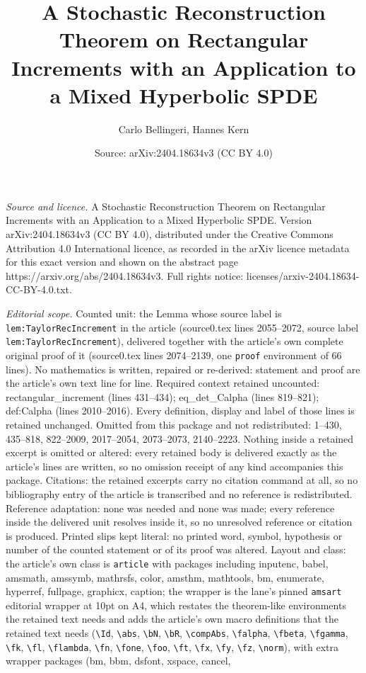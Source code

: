 \documentclass[10pt,a4paper]{amsart}
\title[A Stochastic Reconstruction Theorem on Rectangular Increment]{A Stochastic Reconstruction Theorem on Rectangular Increments with an Application to a Mixed Hyperbolic SPDE}
\author{Carlo Bellingeri, Hannes Kern}
\date{Source: arXiv:2404.18634v3 (CC BY 4.0)}
\begin{document}
\maketitle

\noindent\emph{Source and licence.} A Stochastic Reconstruction Theorem on Rectangular Increments with an Application to a Mixed Hyperbolic SPDE. Version arXiv:2404.18634v3 (CC BY 4.0), distributed under the Creative Commons Attribution 4.0 International licence, as recorded in the arXiv licence metadata for this exact version and shown on the abstract page https://arxiv.org/abs/2404.18634v3. Full rights notice: licenses/arxiv-2404.18634-CC-BY-4.0.txt.\par\smallskip

\noindent\textit{Editorial scope.} Counted unit: the Lemma whose source label is \texttt{lem:TaylorRecIncrement} in the article (source0.tex lines 2055--2072, source label \texttt{lem:TaylorRecIncrement}), delivered together with the article's own complete original proof of it (source0.tex lines 2074--2139, one \texttt{proof} environment of 66 lines). No mathematics is written, repaired or re-derived: statement and proof are the article's own text line for line. Required context retained uncounted: rectangular\_increment (lines 431--434); eq\_det\_Calpha (lines 819--821); def:Calpha (lines 2010--2016). Every definition, display and label of those lines is retained unchanged. Omitted from this package and not redistributed: 1--430, 435--818, 822--2009, 2017--2054, 2073--2073, 2140--2223. Nothing inside a retained excerpt is omitted or altered: every retained body is delivered exactly as the article's lines are written, so no omission receipt of any kind accompanies this package. Citations: the retained excerpts carry no citation command at all, so no bibliography entry of the article is transcribed and no reference is redistributed. Reference adaptation: none was needed and none was made; every reference inside the delivered unit resolves inside it, so no unresolved reference or citation is produced. Printed slips kept literal: no printed word, symbol, hypothesis or number of the counted statement or of its proof was altered. Layout and class: the article's own class is \texttt{article} with packages including inputenc, babel, amsmath, amssymb, mathrsfs, color, amsthm, mathtools, bm, enumerate, hyperref, fullpage, graphicx, caption; the wrapper is the lane's pinned \texttt{amsart} editorial wrapper at 10pt on A4, which restates the theorem-like environments the retained text needs and adds the article's own macro definitions that the retained text needs (\texttt{\textbackslash Id}, \texttt{\textbackslash abs}, \texttt{\textbackslash bN}, \texttt{\textbackslash bR}, \texttt{\textbackslash compAbs}, \texttt{\textbackslash falpha}, \texttt{\textbackslash fbeta}, \texttt{\textbackslash fgamma}, \texttt{\textbackslash fk}, \texttt{\textbackslash fl}, \texttt{\textbackslash flambda}, \texttt{\textbackslash fn}, \texttt{\textbackslash fone}, \texttt{\textbackslash foo}, \texttt{\textbackslash ft}, \texttt{\textbackslash fx}, \texttt{\textbackslash fy}, \texttt{\textbackslash fz}, \texttt{\textbackslash norm}), with extra wrapper packages (bm, bbm, dsfont, xspace, cancel, 
\end{document}
